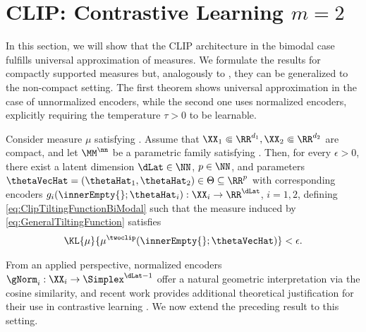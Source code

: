 \documentclass{article}
\begin{document}
\section{CLIP: Contrastive Learning $m=2$}
\label{sec:CLIP}
In this section, we will show that the CLIP architecture in the bimodal
case fulfills universal approximation of measures. We formulate the results
for compactly supported measures but, analogously to
, they can be generalized
to the non-compact setting.  The first theorem
shows universal approximation in the case of unnormalized encoders,
while the second one uses normalized encoders, explicitly requiring
the temperature $\tau > 0$ to be learnable.
\begin{theorem}\leavevmode
 \label{lem:DensityClipUnnormalizedEncoders}
 Consider measure $\mu$ satisfying .
 Assume that $\XX_1 \Subset \RR^{d_1}, \XX_2 \Subset \RR^{d_2}$ are compact, and
 let $\MM^\nn$ be a parametric family satisfying
 .
 Then, for every $\epsilon > 0$, there exist a latent dimension $\dLat \in
  \NN$, $p\in \NN$, and parameters $\thetaVecHat = (\thetaHat_1, \thetaHat_2)
  \in \Theta \subseteq \RR^p$
 with corresponding encoders $g_i(\innerEmpty{};\thetaHat_i) : \XX_i \to
  \RR^{\dLat}$, $i=1,2$, defining \eqref{eq:ClipTiltingFunctionBiModal} such
 that the measure induced by \eqref{eq:GeneralTiltingFunction} satisfies
 \begin{align*}
  \KL{\mu}{\mu^{\twoclip}(\innerEmpty{};\thetaVecHat)} < \epsilon.
 \end{align*}
\end{theorem}

From an applied perspective, normalized encoders $\gNorm_i : \XX_i \to
 \Simplex^{\dLat - 1}$ offer a natural geometric interpretation via the
cosine similarity, and recent work provides additional theoretical
justification for their use in contrastive learning
\citep{wangUnderstandingContrastiveRepresentation2022,
 fengWhenDoesEmbedding2026}. We now extend the preceding result to this
setting.
\end{document}
